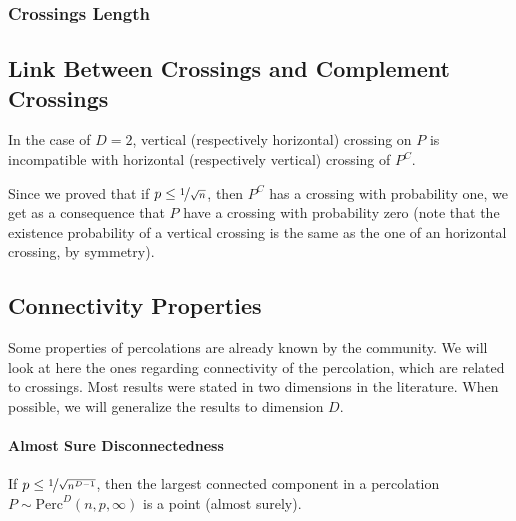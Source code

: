 \subsubsection{Crossings Length}


\subsection{Link Between Crossings and Complement Crossings}
In the case of $D=2$, vertical (respectively horizontal) crossing on $P$ is incompatible with horizontal (respectively vertical) crossing of $P^C$.

Since we proved that if $p \leq \nicefrac{1}{\sqrt{n}}$, then $P^C$ has a crossing with probability one, we get as a consequence that $P$ have a crossing with probability zero (note that the existence probability of a vertical crossing is the same as the one of an horizontal crossing, by symmetry).

\subsection{Connectivity Properties}
Some properties of percolations are already known by the community.
We will look at here the ones regarding connectivity of the percolation, which are related to crossings.
Most results were stated in two dimensions in the literature.
When possible, we will generalize the results to dimension $D$.

\paragraph{Almost Sure Disconnectedness}
If $p \leq \nicefrac{1}{\sqrt{n^{D-1}}}$, then the largest connected component in a percolation $P \sim \text{Perc}^D(n,p,\infty)$ is a point (almost surely).

